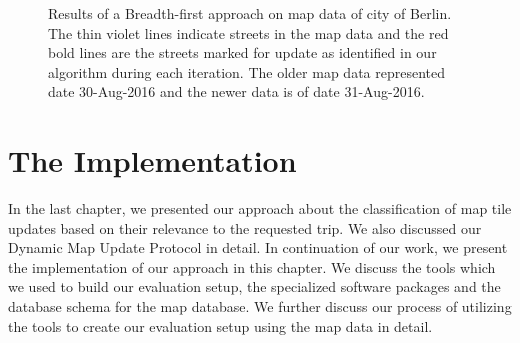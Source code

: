 \begin{figure}
\centering
\label{fg:bfsberlin}
\hspace{5mm}
\hspace{5mm}
\caption{Results of a Breadth-first approach on map data of city of Berlin. The thin violet lines indicate streets in the map data and the red bold lines are the streets marked for update as identified in our algorithm during each iteration. The older map data represented date 30-Aug-2016 and the newer data is of date 31-Aug-2016.}
\end{figure}



\chapter{The Implementation}\label{ch:implementation} %
In the last chapter, we presented our approach about the classification of map tile updates based on their relevance to the requested trip. We also discussed our Dynamic Map Update Protocol in detail. In continuation of our work, we present the implementation of our approach in this chapter. We discuss the tools which we used to build our evaluation setup, the specialized software packages and the database schema for the map database. We further discuss our process of utilizing the tools to create our evaluation setup using the map data in detail. 

